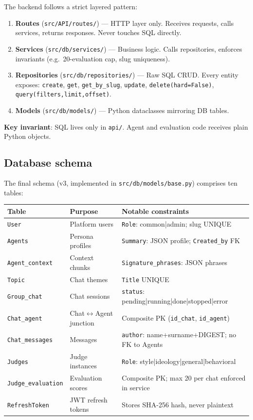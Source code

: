 \documentclass[12pt,a4paper]{article}
\begin{document}
The backend follows a strict layered pattern:

\begin{enumerate}
  \item \textbf{Routes} (\texttt{src/API/routes/}) --- HTTP layer only. Receives requests,
        calls services, returns responses. Never touches SQL directly.
  \item \textbf{Services} (\texttt{src/db/services/}) --- Business logic. Calls repositories,
        enforces invariants (e.g.\ 20-evaluation cap, slug uniqueness).
  \item \textbf{Repositories} (\texttt{src/db/repositories/}) --- Raw SQL CRUD.
        Every entity exposes: \texttt{create}, \texttt{get}, \texttt{get\_by\_slug},
        \texttt{update}, \texttt{delete(hard=False)}, \texttt{query(filters,limit,offset)}.
  \item \textbf{Models} (\texttt{src/db/models/}) --- Python dataclasses mirroring DB tables.
\end{enumerate}

\textbf{Key invariant}: SQL lives only in \texttt{api/}. Agent and evaluation code receives
plain Python objects.

\subsection{Database schema}

The final schema (v3, implemented in \texttt{src/db/models/base.py}) comprises ten tables:

\begin{longtable}{@{}lll@{}}
\toprule
\textbf{Table} & \textbf{Purpose} & \textbf{Notable constraints} \\
\midrule
\texttt{User} & Platform users & \texttt{Role}: common|admin; slug UNIQUE \\
\texttt{Agents} & Persona profiles & \texttt{Summary}: JSON profile; \texttt{Created\_by} FK \\
\texttt{Agent\_context} & Context chunks & \texttt{Signature\_phrases}: JSON phrases \\
\texttt{Topic} & Chat themes & \texttt{Title} UNIQUE \\
\texttt{Group\_chat} & Chat sessions & \texttt{status}: pending|running|done|stopped|error \\
\texttt{Chat\_agent} & Chat$\leftrightarrow$Agent junction & Composite PK (\texttt{id\_chat}, \texttt{id\_agent}) \\
\texttt{Chat\_messages} & Messages & \texttt{author}: name+surname+DIGEST; no FK to Agents \\
\texttt{Judges} & Judge instances & \texttt{Role}: style|ideology|general|behavioral \\
\texttt{Judge\_evaluation} & Evaluation scores & Composite PK; max 20 per chat enforced in service \\
\texttt{RefreshToken} & JWT refresh tokens & Stores SHA-256 hash, never plaintext \\
\bottomrule
\end{longtable}
\end{document}
